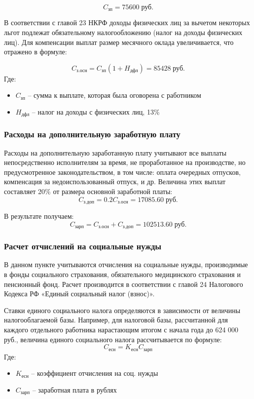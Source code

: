 \documentclass[russian,utf8,emptystyle]{eskdtext}
\begin{document}
\begin{spacing}{1.5}
$$
C_\text{зп} = 75600 \; \text{руб.}
$$

В соответствии с главой 23 НКРФ доходы физических лиц за вычетом некоторых льгот подлежат обязательному налогообложению (налог на доходы физических лиц). Для компенсации выплат размер  месячного оклада увеличивается, что отражено в формуле:

$$
C_\text{з.осн} = C_\text{зп} (1 + H_\text{дфл}) = 85428 \; \text{руб.}
$$
Где:
\begin{itemize}
\item $C_\text{зп}$ -- сумма к выплате, которая была оговорена с работником
\item $H_\text{дфл}$ -- налог на доходы с физических лиц, 13\%
\end{itemize}


\subsubsection{Расходы на дополнительную заработную плату}
Расходы на дополнительную заработанную плату учитывают все выплаты непосредственно исполнителям за время, не проработанное на производстве, но предусмотренное законодательством, в том числе: оплата очередных отпусков, компенсация за недоиспользованный отпуск, и др. Величина этих выплат составляет 20\% от размера основной заработной платы:	
$$
C_\text{з.доп} = 0.2 C_\text{з.осн} = 17085.60 \; \text{руб.}
$$

В результате получаем:
$$
C_\text{зарп} = C_\text{з.осн} + C_\text{з.доп} = 102513.60 \; \text{руб.}
$$

\subsubsection{Расчет отчислений на социальные нужды}
В данном пункте учитываются отчисления на социальные нужды, производимые в фонды социального страхования, обязательного медицинского страхования и пенсионный фонд. Расчет производится в соответствии с главой 24 Налогового Кодекса РФ «Единый социальный налог (взнос)». 

Ставки единого социального налога определяются в зависимости от величины налогооблагаемой базы. Например, для налоговой базы, рассчитанной для каждого отдельного работника нарастающим итогом с начала года до 624 000 руб., величина единого социального налога рассчитывается по формуле:
$$
C_\text{есн} = K_\text{есн} C_\text{зарп}
$$
Где:
\begin{itemize}
\item $K_\text{есн}$ -- коэффициент отчисления на соц. нужды
\item $C_\text{зарп}$ -- заработная плата в рублях
\end{itemize}


\end{spacing}
\end{document}
